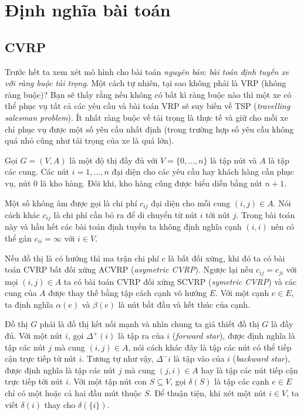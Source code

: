 \section{Định nghĩa bài toán}

\subsection{CVRP}

Trước hết ta xem xét mô hình cho bài toán \textit{nguyên bản}: \textit{bài toán định tuyến xe với ràng buộc tải trọng}. Một cách tự nhiên, tại sao không phải là VRP (không ràng buộc)? Bạn sẽ thấy rằng nếu không có bất kì ràng buộc nào thì một xe có thể phục vụ tất cả các yêu cầu và bài toán VRP sẽ suy biến về TSP (\textit{travelling salesman problem}). Ít nhất ràng buộc về tải trọng là thực tế và giữ cho mỗi xe chỉ phục vụ được một số yêu cầu nhất định (trong trường hợp số yêu cầu không quá nhỏ cũng như tải trọng của xe là quá lớn). 


Gọi $G=(V,A)$ là một độ thị đầy đủ với $V=\{ 0, ..., n \}$ là tập nút và $A$ là tập các cung. Các nút $i=1,...,n$ đại diện cho các yêu cầu hay khách hàng cần phục vụ, nút $0$ là kho hàng. Đôi khi, kho hàng cũng được biểu diễn bằng nút $n+1$.

Một số không âm được gọi là chi phí $c_{ij}$ đại diện cho mỗi cung $(i,j) \in A$. Nói cách khác $c_{ij}$ là  chi phí cần bỏ ra để di chuyển từ nút $i$ tới nút $j$. Trong bài toán này và hầu hết các bài toán định tuyến ta không định nghĩa cạnh $(i,i)$ nên có thể gán $c_{ii} = \infty$ với $i \in V$.

Nếu đồ thị là có hướng thì ma trận chi phí $c$ là bất đối xứng, khi đó ta có bài toán CVRP bất đối xứng ACVRP (\textit{asymetric CVRP}). Ngược lại nếu $c_{ij} = c_{ji}$ với mọi $(i,j) \in A$ ta có bài toán CVRP đối xứng SCVRP (\textit{symetric CVRP}) và các cung của $A$ được thay thế bằng tập cách cạnh vô hướng $E$. Với một cạnh $e \in E$, ta định nghĩa $\alpha(e)$ và $\beta(e)$ là nút bắt đầu và kết thúc của cạnh. 

Đồ thị $G$ phải là đồ thị kết nối mạnh và nhìn chung ta giả thiết đồ thị $G$ là đầy đủ. Với một nút $i$, gọi $\Delta^+(i)$ là tập ra của $i$ (\textit{forward star}), được định nghĩa là tập các nút $j$ mà cung $(i,j) \in A$, nói cách khác đây là tập các nút có thể tiếp cận trực tiếp từ nút $i$. Tương tự như vậy, $\Delta^-{i}$ là tập vào của $i$ (\textit{backward star}), được định nghĩa là tập các nút $j$ mà cung $(j,i) \in A$ hay là tập các nút tiếp cận trực tiếp tới nút $i$. Với một tập nút con $S \subseteq V$, gọi $\delta(S)$ là tập các cạnh $e \in E$ chỉ có một hoặc cả hai đầu mút thuộc $S$. Để thuận tiện, khi xét một nút $i \in V$, ta viết $\delta(i)$ thay cho $\delta(\{i\})$.

